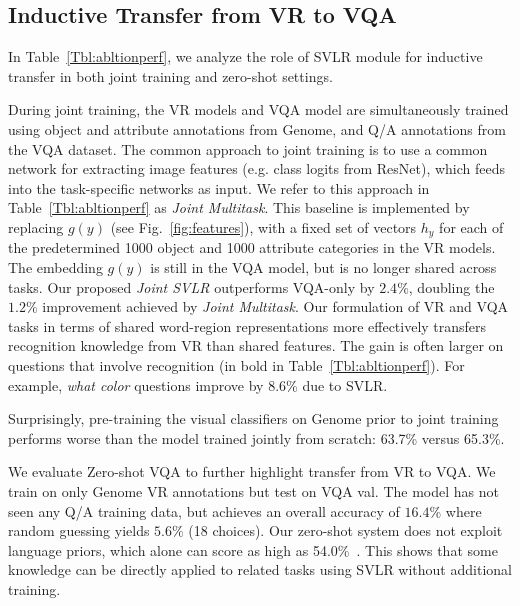 \subsection{Inductive Transfer from VR to VQA}\label{sec:vqa_eval}\label{sec:vr2vqa}
In Table~\ref{Tbl:abltionperf}, we analyze the role of SVLR module for inductive transfer in both joint training and zero-shot settings.

 During joint training, the VR models and VQA model are simultaneously trained using object and attribute annotations from Genome, and Q/A annotations from the VQA dataset. The common approach to joint training is to use a common network for extracting image features (e.g. class logits from ResNet), which feeds into the task-specific networks as input. We refer to this approach in Table~\ref{Tbl:abltionperf} as \textit{Joint Multitask}. This baseline is implemented by replacing $g(y)$ (see Fig.~\ref{fig:features}),  with a fixed set of vectors $h_y$ for each of the predetermined 1000 object and 1000 attribute categories in the VR models. The embedding $g(y)$ is still in the VQA model, but is no longer shared across tasks. Our proposed \textit{Joint SVLR} outperforms VQA-only by $2.4\%$, doubling the $1.2\%$ improvement achieved by \textit{Joint Multitask}.  Our formulation of VR and VQA tasks in terms of shared word-region representations more effectively transfers recognition knowledge from VR than shared features.  The gain is often larger on questions that involve recognition (in bold in Table~\ref{Tbl:abltionperf}).  For example, \textit{what color} questions improve by $8.6\%$ due to SVLR.

Surprisingly, pre-training the visual classifiers on Genome prior to joint training performs worse than the model trained jointly from scratch: 63.7\% versus 65.3\%.

 We evaluate Zero-shot VQA to further highlight transfer from VR to VQA. We train on only Genome VR annotations but test on VQA val. The model has not seen any Q/A training data, but achieves an overall accuracy of $16.4\%$ where random guessing yields $5.6\%$ (18 choices).  Our zero-shot system does not exploit language priors, which alone can score as high as 54.0$\%$~\cite{shih2016look}. This shows that some knowledge can be directly applied to related tasks using SVLR without additional training.

